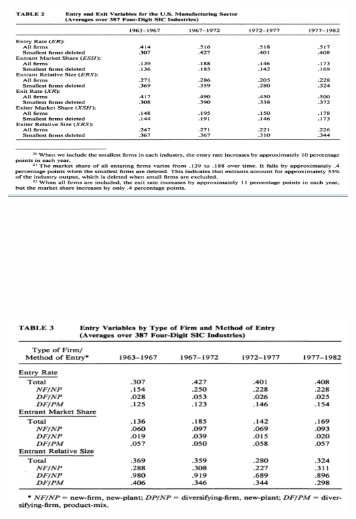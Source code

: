 \documentclass[dvipdfmx,12pt]{beamer}
\begin{document}
\begin{frame}

\begin{center}

\includegraphics[width=9cm,height=7.75cm]{DRS_T2.pdf}

\end{center}

\end{frame}

\begin{frame}

\begin{center}

\includegraphics[width=9cm,height=7.75cm]{DRS_T3.pdf}

\end{center}

\end{frame}
\end{document}
